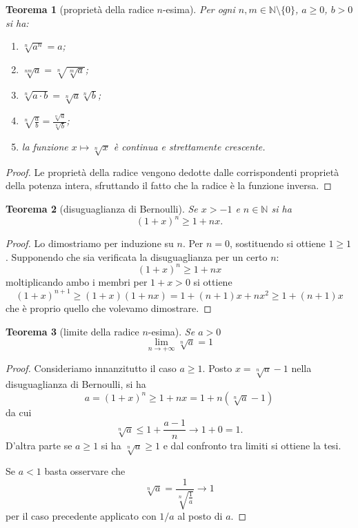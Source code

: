 \documentclass[italian,a4paper,oneside,headinclude]{scrbook}
\newcommand{\NN}{\mathbb N}
\newtheorem{theorem}{Teorema}
\begin{document}
\begin{theorem}[proprietà della radice $n$-esima]
Per ogni $n,m \in \NN\setminus\{0\}$, $a\ge 0$, $b>0$ si ha:
\begin{enumerate}
\item $\sqrt[n]{a^n} = a$;
\item $\displaystyle \sqrt[nm]{a} = \sqrt[n]{\sqrt[m]{a}}$;
\item $\displaystyle \sqrt[n]{a\cdot b} = \sqrt[n]{a}\sqrt[n]{b}$;
\item $\displaystyle \sqrt[n]{\frac a b} = \frac{\sqrt[n]{a}}{\sqrt[n]{b}}$;
\item la funzione $x\mapsto \sqrt[n]{x}$ è continua e strettamente crescente.
\end{enumerate}
\end{theorem}

\begin{proof}
Le proprietà della radice vengono dedotte dalle corrispondenti proprietà
della potenza intera, sfruttando il fatto che la radice è la funzione inversa.
\end{proof}

\begin{theorem}[disuguaglianza di Bernoulli]
Se $x > -1$ e $n\in \NN$ si ha
\[
(1+x)^n \ge 1 + nx.
\]
\end{theorem}
%
\begin{proof}
Lo dimostriamo per induzione su $n$. Per $n=0$, sostituendo si ottiene $1\ge 1$.
Supponendo che sia verificata la disuguaglianza per un certo $n$:
\[
(1+x)^n \ge 1 + nx
\]
moltiplicando ambo i membri per $1+x > 0$ si ottiene
\[
(1+x)^{n+1} \ge (1+x) (1+nx) = 1 + (n+1)x + n x^2
\ge 1 + (n+1)x
\]
che è proprio quello che volevamo dimostrare.
\end{proof}

\begin{theorem}[limite della radice $n$-esima]
Se $a>0$
\[
   \lim_{n\to +\infty} \sqrt[n]{a} = 1
\]
\end{theorem}
%
\begin{proof}
Consideriamo innanzitutto il caso $a\ge 1$.
Posto $x=\sqrt[n]{a}-1$ nella disuguaglianza di Bernoulli, si ha
\[
a
= (1+x)^n
\ge 1 + nx
= 1 + n (\sqrt[n]{a}-1)
\]
da cui
\[
 \sqrt[n]{a} \le 1 + \frac{a-1}{n} \to 1 + 0 = 1.
\]
D'altra parte se $a\ge 1$ si ha $\sqrt[n]{a} \ge 1$
e dal confronto tra limiti si ottiene la tesi.

Se $a<1$ basta osservare che
\[
\sqrt[n]{a} = \frac{1}{\sqrt[n]{\frac 1 a}} \to 1
\]
per il caso precedente applicato con $1/a$ al posto di $a$.
\end{proof}
\end{document}
